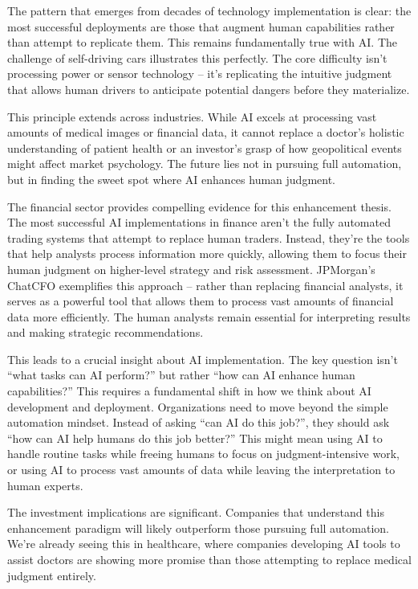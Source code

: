\documentclass[
  Letterpaper,
]{scrbook}
\begin{document}
The pattern that emerges from decades of technology implementation is
clear: the most successful deployments are those that augment human
capabilities rather than attempt to replicate them. This remains
fundamentally true with AI. The challenge of self-driving cars
illustrates this perfectly. The core difficulty isn't processing power
or sensor technology -- it's replicating the intuitive judgment that
allows human drivers to anticipate potential dangers before they
materialize.

This principle extends across industries. While AI excels at processing
vast amounts of medical images or financial data, it cannot replace a
doctor's holistic understanding of patient health or an investor's grasp
of how geopolitical events might affect market psychology. The future
lies not in pursuing full automation, but
in finding the sweet spot where AI enhances human
judgment.

The financial sector provides compelling evidence for this
enhancement thesis. The most
successful AI implementations in finance aren't the fully automated
trading systems that attempt to replace human traders. Instead, they're
the tools that help analysts process information more quickly, allowing
them to focus their human judgment on higher-level strategy and risk
assessment. JPMorgan's ChatCFO exemplifies
this approach -- rather than replacing financial analysts, it serves as
a powerful tool that allows them to process vast amounts of financial
data more efficiently. The human analysts remain essential for
interpreting results and making strategic recommendations.

This leads to a crucial insight about AI implementation. The key
question isn't ``what tasks can AI perform?'' but rather ``how can AI
enhance human capabilities?'' This requires a fundamental shift in how
we think about AI development and deployment. Organizations need to move
beyond the simple automation mindset. Instead of asking ``can AI do this
job?'', they should ask ``how can AI help humans do this job better?''
This might mean using AI to handle routine tasks while freeing humans to
focus on judgment-intensive work, or using AI to process vast amounts of
data while leaving the interpretation to human experts.

The investment implications are significant. Companies that understand
this enhancement paradigm will likely outperform those pursuing full
automation. We're already seeing this in healthcare,
where companies developing AI tools to assist doctors are showing more
promise than those attempting to replace medical judgment entirely.
\end{document}
